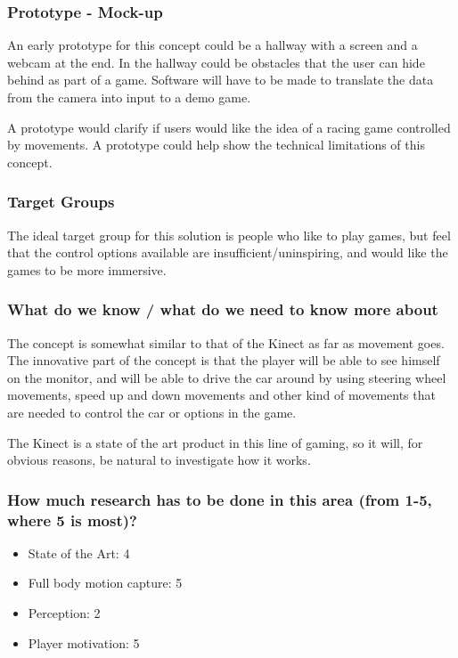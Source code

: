 \subsubsection*{Prototype - Mock-up}
An early prototype for this concept could be a hallway with a screen and a webcam at the end. In the hallway could be obstacles that the user can hide behind as part of a game. Software will have to be made to translate the data from the camera into input to a demo game.

A prototype would clarify if users would like the idea of a racing game controlled by movements. A prototype could help show the technical limitations of this concept.


\subsubsection*{Target Groups}
The ideal target group for this solution is people who like to play games, but feel that the control options available are insufficient/uninspiring, and would like the games to be more immersive.


\subsubsection*{What do we know / what do we need to know more about}
The concept is somewhat similar to that of the Kinect as far as movement goes. The innovative part of the concept is that the player will be able to see himself on the monitor, and will be able to drive the car around by using steering wheel movements, speed up and down movements and other kind of movements that are needed to control the car or options in the game.

The Kinect is a state of the art product in this line of gaming, so it will, for obvious reasons, be natural to investigate how it works.


\subsubsection*{How much research has to be done in this area (from 1-5, where 5 is most)?}
\begin{itemize}
\item State of the Art: 4
\item Full body motion capture: 5
\item Perception: 2
\item Player motivation: 5
\end{itemize}


